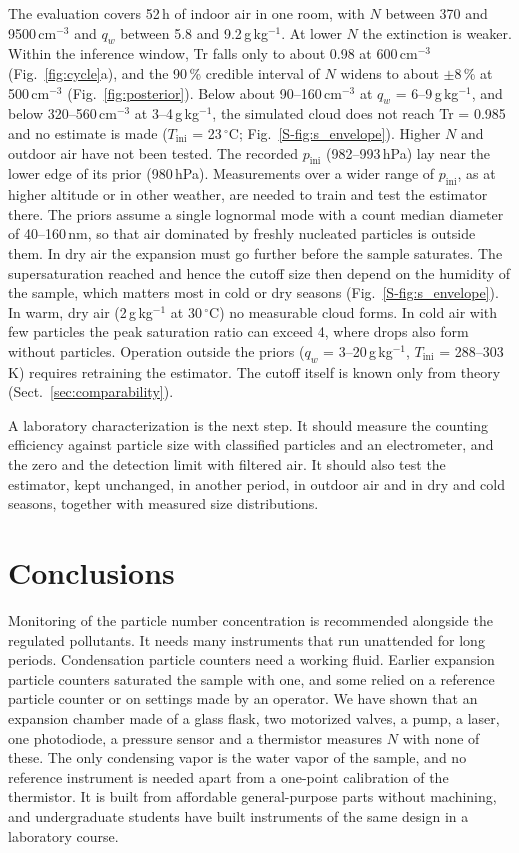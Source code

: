 \documentclass[preprint,review,12pt,authoryear]{elsarticle}
\begin{document}
The evaluation covers 52\,h of indoor air in one room, with $N$ between 370 and
9500\,cm$^{-3}$ and $q_w$ between 5.8 and 9.2\,g\,kg$^{-1}$.
At lower $N$ the extinction is weaker. Within the inference window, Tr falls only to about 0.98 at
600\,cm$^{-3}$ (Fig.~\ref{fig:cycle}a), and the 90\,\% credible interval of $N$ widens to about $\pm8$\,\%
at 500\,cm$^{-3}$ (Fig.~\ref{fig:posterior}).
Below about 90--160\,cm$^{-3}$ at $q_w$ = 6--9\,g\,kg$^{-1}$, and below 320--560\,cm$^{-3}$ at
3--4\,g\,kg$^{-1}$, the simulated cloud does not reach Tr = 0.985 and no estimate is made
($T_\mathrm{ini}$ = 23\,$^\circ$C; Fig.~\ref{S-fig:s_envelope}).
Higher $N$ and outdoor air have not been tested.
The recorded $p_\mathrm{ini}$ (982--993\,hPa) lay near the lower edge of its prior (980\,hPa).
Measurements over a wider range of $p_\mathrm{ini}$, as at higher altitude or in other weather, are
needed to train and test the estimator there.
The priors assume a single lognormal mode with a count median
diameter of 40--160\,nm, so that air dominated by freshly nucleated particles is outside them.
In dry air the expansion must go further before the sample saturates.
The supersaturation reached and hence the cutoff size then depend on the humidity of the sample,
which matters most in cold or dry seasons (Fig.~\ref{S-fig:s_envelope}). In warm, dry air
(2\,g\,kg$^{-1}$ at 30\,$^\circ$C) no measurable cloud forms. In cold air with few particles the
peak saturation ratio can exceed 4, where drops also form without particles. Operation outside the
priors ($q_w$ = 3--20\,g\,kg$^{-1}$, $T_\mathrm{ini}$ = 288--303\,K) requires retraining the
estimator.
The cutoff itself is known only from theory (Sect.~\ref{sec:comparability}).

A laboratory characterization is the next step. It should measure the counting efficiency against
particle size with classified particles and an electrometer, and the zero and the detection limit
with filtered air. It should also test the estimator, kept unchanged, in another period, in outdoor
air and in dry and cold seasons, together with measured size distributions.

\section{Conclusions}
Monitoring of the particle number concentration is recommended alongside the regulated pollutants.
It needs many instruments that run unattended for long periods. Condensation particle counters need a
working fluid. Earlier expansion particle counters saturated the sample with one, and some relied on a
reference particle counter or on settings made by an operator.
We have shown that an expansion chamber made of a glass flask, two motorized valves, a pump, a
laser, one photodiode, a pressure sensor and a thermistor measures $N$ with none of these.
The only condensing vapor is the water vapor of the sample, and no reference instrument is needed
apart from a one-point calibration of the thermistor.
It is built from affordable general-purpose parts without machining, and undergraduate students
have built instruments of the same design in a laboratory course.
\end{document}
